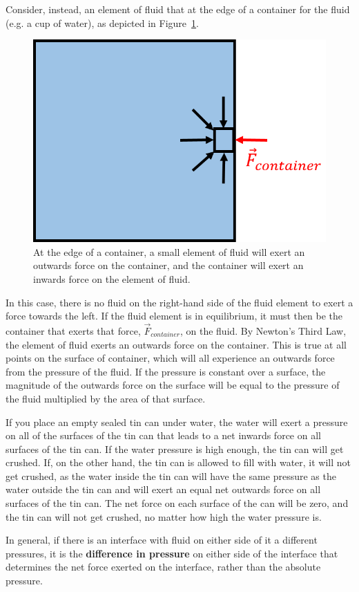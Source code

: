 Consider, instead, an element of fluid that at the edge of a container for the fluid (e.g. a cup of water), as depicted in Figure~\ref{fig:fluidmechanics:pressure_edge}.

\begin{figure}[!htbp]
\centering
\includegraphics[width=0.5\linewidth]{files/pressure_edge-c7179da01e0197a8960032a3a1a63f11.png}
\caption[]{At the edge of a container, a small element of fluid will exert an outwards force on the container, and the container will exert an inwards force on the element of fluid.}
\label{fig:fluidmechanics:pressure_edge}
\end{figure}

In this case, there is no fluid on the right-hand side of the fluid element to exert a force towards the left. If the fluid element is in equilibrium, it must then be the container that exerts that force, $\vec F_{container}$, on the fluid. By Newton's Third Law, the element of fluid exerts an outwards force on the container. This is true at all points on the surface of container, which will all experience an outwards force from the pressure of the fluid. If the pressure is constant over a surface, the magnitude of the outwards force on the surface will be equal to the pressure of the fluid multiplied by the area of that surface.

If you place an empty sealed tin can under water, the water will exert a pressure on all of the surfaces of the tin can that leads to a net inwards force on all surfaces of the tin can. If the water pressure is high enough, the tin can will get crushed. If, on the other hand, the tin can is allowed to fill with water, it will not get crushed, as the water inside the tin can will have the same pressure as the water outside the tin can and will exert an equal net outwards force on all surfaces of the tin can. The net force on each surface of the can will be zero, and the tin can will not get crushed, no matter how high the water pressure is.

In general, if there is an interface with fluid on either side of it a different pressures, it is the \textbf{difference in pressure} on either side of the interface that determines the net force exerted on the interface, rather than the absolute pressure.

